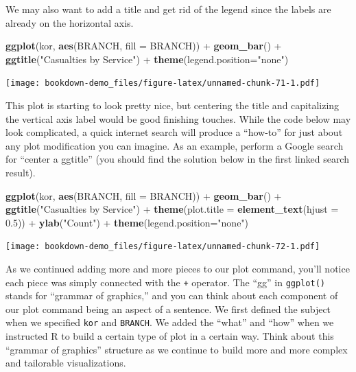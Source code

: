 \documentclass[]{book}
\newenvironment{Shaded}{\begin{snugshade}}{\end{snugshade}}
\newcommand{\KeywordTok}[1]{\textcolor[rgb]{0.13,0.29,0.53}{\textbf{{#1}}}}
\newcommand{\DataTypeTok}[1]{\textcolor[rgb]{0.13,0.29,0.53}{{#1}}}
\newcommand{\FloatTok}[1]{\textcolor[rgb]{0.00,0.00,0.81}{{#1}}}
\newcommand{\StringTok}[1]{\textcolor[rgb]{0.31,0.60,0.02}{{#1}}}
\newcommand{\NormalTok}[1]{{#1}}
\begin{document}
We may also want to add a title and get rid of the legend since the
labels are already on the horizontal axis.

\begin{Shaded}
\begin{Highlighting}[]
\KeywordTok{ggplot}\NormalTok{(kor, }\KeywordTok{aes}\NormalTok{(BRANCH, }\DataTypeTok{fill =} \NormalTok{BRANCH)) +}\StringTok{ }\KeywordTok{geom_bar}\NormalTok{() +}\StringTok{ }
\StringTok{  }\KeywordTok{ggtitle}\NormalTok{(}\StringTok{"Casualties by Service"}\NormalTok{) +}\StringTok{ }\KeywordTok{theme}\NormalTok{(}\DataTypeTok{legend.position=}\StringTok{"none"}\NormalTok{)}
\end{Highlighting}
\end{Shaded}

\texttt{[image: bookdown-demo\_files/figure-latex/unnamed-chunk-71-1.pdf]}

This plot is starting to look pretty nice, but centering the title and
capitalizing the vertical axis label would be good finishing touches.
While the code below may look complicated, a quick internet search will
produce a ``how-to'' for just about any plot modification you can
imagine. As an example, perform a Google search for ``center a ggtitle''
(you should find the solution below in the first linked search result).

\begin{Shaded}
\begin{Highlighting}[]
\KeywordTok{ggplot}\NormalTok{(kor, }\KeywordTok{aes}\NormalTok{(BRANCH, }\DataTypeTok{fill =} \NormalTok{BRANCH)) +}\StringTok{ }\KeywordTok{geom_bar}\NormalTok{() +}\StringTok{ }
\StringTok{  }\KeywordTok{ggtitle}\NormalTok{(}\StringTok{"Casualties by Service"}\NormalTok{) +}\StringTok{ }
\StringTok{  }\KeywordTok{theme}\NormalTok{(}\DataTypeTok{plot.title =} \KeywordTok{element_text}\NormalTok{(}\DataTypeTok{hjust =} \FloatTok{0.5}\NormalTok{)) +}\StringTok{ }
\StringTok{  }\KeywordTok{ylab}\NormalTok{(}\StringTok{"Count"}\NormalTok{) +}\StringTok{ }\KeywordTok{theme}\NormalTok{(}\DataTypeTok{legend.position=}\StringTok{"none"}\NormalTok{)}
\end{Highlighting}
\end{Shaded}

\texttt{[image: bookdown-demo\_files/figure-latex/unnamed-chunk-72-1.pdf]}

As we continued adding more and more pieces to our plot command, you'll
notice each piece was simply connected with the \texttt{+} operator. The
``gg'' in \texttt{ggplot()} stands for ``grammar of graphics,'' and you
can think about each component of our plot command being an aspect of a
sentence. We first defined the subject when we specified \texttt{kor}
and \texttt{BRANCH}. We added the ``what'' and ``how'' when we
instructed R to build a certain type of plot in a certain way. Think
about this ``grammar of graphics'' structure as we continue to build
more and more complex and tailorable visualizations.
\end{document}
